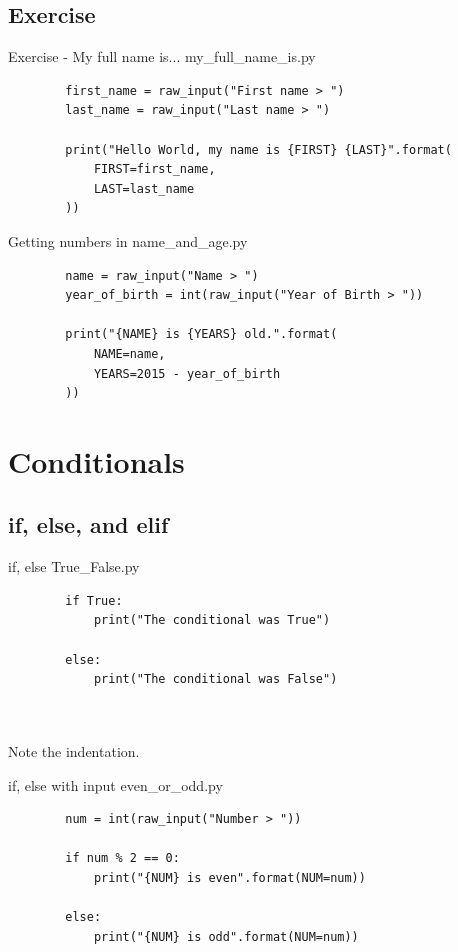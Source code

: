 \documentclass[11pt]{beamer}
\newcommand{\emptyline}{$ $\\}
\begin{document}
\subsection{Exercise}
\begin{frame}[fragile]{Exercise - My full name is...}
	\pause
	my\_full\_name\_is.py
	\begin{lstlisting}
		first_name = raw_input("First name > ")
		last_name = raw_input("Last name > ")
		
		print("Hello World, my name is {FIRST} {LAST}".format(
		    FIRST=first_name, 
		    LAST=last_name
		))
	\end{lstlisting}
\end{frame}

\begin{frame}[fragile]{Getting numbers in}
	name\_and\_age.py
	\begin{lstlisting}
		name = raw_input("Name > ")
		year_of_birth = int(raw_input("Year of Birth > "))
		
		print("{NAME} is {YEARS} old.".format(
		    NAME=name,
		    YEARS=2015 - year_of_birth		
		))
	\end{lstlisting}
\end{frame}

\section{Conditionals}
\subsection{if, else, and elif}
\begin{frame}[fragile]{if, else}
	True\_False.py
	\begin{lstlisting}
		if True:
		    print("The conditional was True")
		
		else:
		    print("The conditional was False")
	\end{lstlisting}
	\emptyline
	\emptyline
	\pause
	Note the indentation.
\end{frame}

\begin{frame}[fragile]{if, else with input}
	even\_or\_odd.py
	\begin{lstlisting}
		num = int(raw_input("Number > "))
		
		if num % 2 == 0:
		    print("{NUM} is even".format(NUM=num))
		
		else:
		    print("{NUM} is odd".format(NUM=num))
	\end{lstlisting}
\end{frame}
\end{document}

